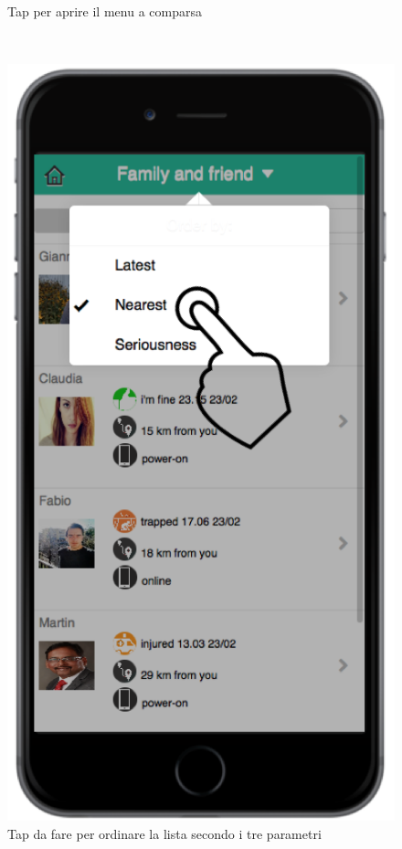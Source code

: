 \begin{figure}
\begin{minipage}[b]{6cm}
	\caption{Tap per aprire il menu a comparsa }
	\label{fig:comparsa}
 \end{minipage}
 \ \hspace{6 mm} \hspace{7 mm} \
 \begin{minipage}[b]{6cm}
\centering
	\includegraphics[scale=0.9]{interfaccia/etichetta.png}
	\caption{Tap da fare per ordinare la lista secondo i tre parametri }
	\label{fig:etichetta}
 \end{minipage}
\end{figure}


